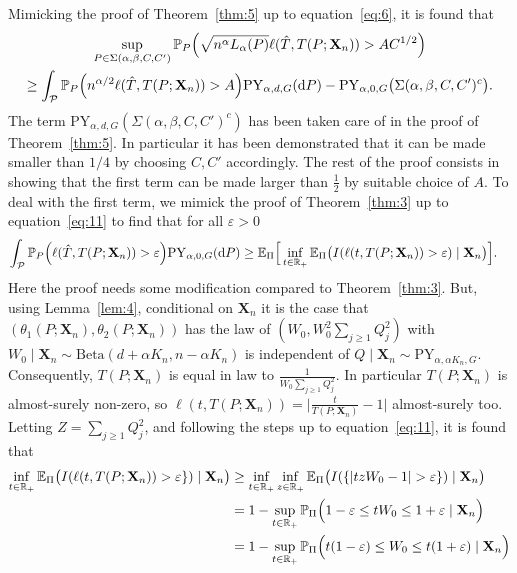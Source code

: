 \documentclass{article}
\newcommand{\1}{\boldsymbol{1}}
\newcommand{\EE}{\mathbb{E}}
\newcommand{\PP}{\mathbb{P}}
\theoremstyle{plain}
\begin{document}
Mimicking the proof of Theorem~\ref{thm:5} up to equation~\eqref{eq:6}, it is found that
  \begin{multline*}
    \sup_{P\in \Sigma(\alpha,\beta,C,C')}\PP_P\Big( \sqrt{n^{\alpha}L_{\alpha}(P)} \ell(\hat{T},T(P;\mathbf{X}_n)) > AC^{1/2} \Big)\\%
    \geq \int_{\mathcal{P}}\PP_P\Big(n^{\alpha/2}\ell(\hat{T},T(P;\mathbf{X}_n)) > A \Big) \mathrm{PY}_{\alpha,d,G}(\intd P)%
    - \mathrm{PY}_{\alpha,0,G}\big( \Sigma(\alpha,\beta,C,C')^c \big).
  \end{multline*}
  The term $\mathrm{PY}_{\alpha,d,G}( \Sigma(\alpha,\beta,C,C')^c)$ has been taken care of in the proof of Theorem~\ref{thm:5}. In particular it has been demonstrated that it can be made smaller than $1/4$ by choosing $C,C'$ accordingly. The rest of the proof consists in showing that the first term can be made larger than $\frac{1}{2}$ by suitable choice of $A$. To deal with the first term, we mimick the proof of Theorem~\ref{thm:3} up to equation~\eqref{eq:11} to find that for all $\varepsilon > 0$
  \begin{align*}
    \int_{\mathcal{P}}\PP_P\Big( \ell(\hat{T},T(P;\mathbf{X}_n)) > \varepsilon \Big) \mathrm{PY}_{\alpha,0,G}(\intd P)%
    &\geq \EE_{\Pi}\Big[ \inf_{t\in \NNReals}\EE_{\Pi}\big( I(\ell(t,T(P;\mathbf{X}_n))> \varepsilon)  \mid \mathbf{X}_n\big) \Big].
  \end{align*}
  Here the proof needs some modification compared to Theorem~\ref{thm:3}. But, using Lemma~\ref{lem:4}, conditional on $\mathbf{X}_n$ it is the case that $(\theta_1(P;\mathbf{X}_n),\theta_2(P;\mathbf{X}_n))$ has the law of $(W_0,W_0^2\sum_{j\geq 1}Q_j^2)$ with $W_0 \mid \mathbf{X}_n \sim\mathrm{Beta}(d + \alpha K_n, n - \alpha K_n)$ is independent of $Q \mid \mathbf{X}_n \sim \mathrm{PY}_{\alpha,\alpha K_n,G}$. Consequently, $T(P;\mathbf{X}_n)$ is equal in law to $\frac{1}{W_0\sum_{j\geq 1}Q_j^2}$. In particular $T(P;\mathbf{X}_n)$ is almost-surely non-zero, so $\ell(t,T(P;\mathbf{X}_n)) = \big|\frac{t}{T(P;\mathbf{X}_n)} -1 \big|$ almost-surely too. Letting $Z = \sum_{j\geq 1}Q_j^2$, and following the steps up to equation~\eqref{eq:11}, it is found that
  \begin{align*}
    \inf_{t\in \NNReals}\EE_{\Pi}\big(I( \ell(t,T(P;\mathbf{X}_n)) > \varepsilon\} ) \mid \mathbf{X}_n\big)
    &\geq \inf_{t\in \NNReals}\inf_{z\in \NNReals} \EE_{\Pi}\big(I( \{ |t z W_0 - 1| > \varepsilon\} ) \mid \mathbf{X}_n\big)\\
    &=1 - \sup_{t\in \NNReals}\PP_{\Pi}\Big(1 - \varepsilon \leq t W_0 \leq 1 + \varepsilon \mid \mathbf{X}_n\Big)\\
    &= 1 - \sup_{t\in \NNReals}\PP_{\Pi}\Big( t(1 - \varepsilon) \leq W_0 \leq t(1 + \varepsilon) \mid \mathbf{X}_n\Big)\\
  \end{align*}
\end{document}
